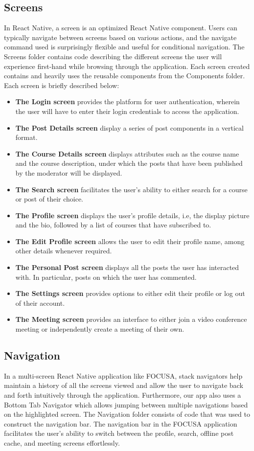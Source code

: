 \subsection{Screens}
In React Native, a screen is an optimized React Native component. Users can typically navigate between screens based on various actions, 
and the navigate command used is surprisingly flexible and useful for conditional navigation.
The Screens folder contains code describing the different screens the user will experience first-hand while browsing through the application. 
Each screen created contains and heavily uses the reusable components from the Components folder. Each screen is briefly described below: 
\begin{itemize}
    \item \textbf{The Login screen} provides the platform for user authentication, wherein the user will have to enter their login credentials to access the application. 
    \item \textbf{The Post Details screen} display a series of post components in a vertical format.
    \item \textbf{The Course Details screen} displays attributes such as the course name and the course description, under which the posts that have been published by the moderator will be displayed. 
    \item \textbf{The Search screen} facilitates the user's ability to either search for a course or post of their choice.
    \item \textbf{The Profile screen} displays the user's profile details, i.e, the display picture and the bio, 
    followed by a list of courses that have subscribed to.
    \item \textbf{The Edit Profile screen} allows the user to edit their profile name, among other details whenever required.
    \item \textbf{The Personal Post screen} displays all the posts the user has interacted with. In particular, posts on which the user has commented.
    \item \textbf{The Settings screen} provides options to either edit their profile or log out of their account.
    \item \textbf{The Meeting screen} provides an interface to either join a video conference meeting or independently create a meeting of their own.
\end{itemize}

\subsection{Navigation}
In a multi-screen React Native application like FOCUSA, stack navigators help maintain a history of all the screens viewed and allow the user to navigate back and forth intuitively through the application. Furthermore, our app also uses a Bottom Tab 
Navigator which allows jumping between multiple navigations based on the highlighted screen.
The Navigation folder consists of code that was used to construct the navigation bar. 
The navigation bar in the FOCUSA application facilitates the user's ability to switch 
between the profile, search, offline post cache, and meeting screens effortlessly.

